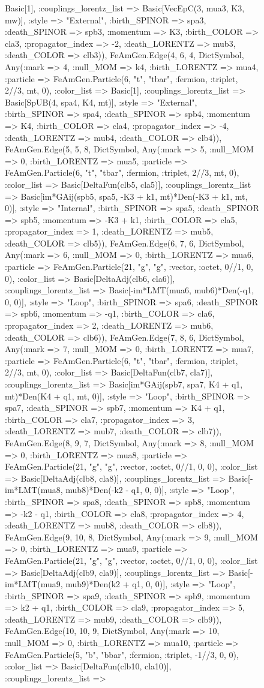 \documentclass{revtex4}
\begin{document}
\begin{figure}[!htb]
\begin{center}
{Basic[1], :couplings_lorentz_list => Basic[VecEpC(3, mua3, K3, mw)], :style => "External", :birth_SPINOR => spa3, :death_SPINOR => spb3, :momentum => K3, :birth_COLOR => cla3, :propagator_index => -2, :death_LORENTZ => mub3, :death_COLOR => clb3)), FeAmGen.Edge(4, 6, 4, Dict{Symbol, Any}(:mark => 4, :null_MOM => k4, :birth_LORENTZ => mua4, :particle => FeAmGen.Particle(6, "t", "tbar", :fermion, :triplet, 2//3, mt, 0), :color_list => Basic[1], :couplings_lorentz_list => Basic[SpUB(4, spa4, K4, mt)], :style => "External", :birth_SPINOR => spa4, :death_SPINOR => spb4, :momentum => K4, :birth_COLOR => cla4, :propagator_index => -4, :death_LORENTZ => mub4, :death_COLOR => clb4)), FeAmGen.Edge(5, 5, 8, Dict{Symbol, Any}(:mark => 5, :null_MOM => 0, :birth_LORENTZ => mua5, :particle => FeAmGen.Particle(6, "t", "tbar", :fermion, :triplet, 2//3, mt, 0), :color_list => Basic[DeltaFun(clb5, cla5)], :couplings_lorentz_list => Basic[im*GAij(spb5, spa5, -K3 + k1, mt)*Den(-K3 + k1, mt, 0)], :style => "Internal", :birth_SPINOR => spa5, :death_SPINOR => spb5, :momentum => -K3 + k1, :birth_COLOR => cla5, :propagator_index => 1, :death_LORENTZ => mub5, :death_COLOR => clb5)), FeAmGen.Edge(6, 7, 6, Dict{Symbol, Any}(:mark => 6, :null_MOM => 0, :birth_LORENTZ => mua6, :particle => FeAmGen.Particle(21, "g", "g", :vector, :octet, 0//1, 0, 0), :color_list => Basic[DeltaAdj(clb6, cla6)], :couplings_lorentz_list => Basic[-im*LMT(mua6, mub6)*Den(-q1, 0, 0)], :style => "Loop", :birth_SPINOR => spa6, :death_SPINOR => spb6, :momentum => -q1, :birth_COLOR => cla6, :propagator_index => 2, :death_LORENTZ => mub6, :death_COLOR => clb6)), FeAmGen.Edge(7, 8, 6, Dict{Symbol, Any}(:mark => 7, :null_MOM => 0, :birth_LORENTZ => mua7, :particle => FeAmGen.Particle(6, "t", "tbar", :fermion, :triplet, 2//3, mt, 0), :color_list => Basic[DeltaFun(clb7, cla7)], :couplings_lorentz_list => Basic[im*GAij(spb7, spa7, K4 + q1, mt)*Den(K4 + q1, mt, 0)], :style => "Loop", :birth_SPINOR => spa7, :death_SPINOR => spb7, :momentum => K4 + q1, :birth_COLOR => cla7, :propagator_index => 3, :death_LORENTZ => mub7, :death_COLOR => clb7)), FeAmGen.Edge(8, 9, 7, Dict{Symbol, Any}(:mark => 8, :null_MOM => 0, :birth_LORENTZ => mua8, :particle => FeAmGen.Particle(21, "g", "g", :vector, :octet, 0//1, 0, 0), :color_list => Basic[DeltaAdj(clb8, cla8)], :couplings_lorentz_list => Basic[-im*LMT(mua8, mub8)*Den(-k2 - q1, 0, 0)], :style => "Loop", :birth_SPINOR => spa8, :death_SPINOR => spb8, :momentum => -k2 - q1, :birth_COLOR => cla8, :propagator_index => 4, :death_LORENTZ => mub8, :death_COLOR => clb8)), FeAmGen.Edge(9, 10, 8, Dict{Symbol, Any}(:mark => 9, :null_MOM => 0, :birth_LORENTZ => mua9, :particle => FeAmGen.Particle(21, "g", "g", :vector, :octet, 0//1, 0, 0), :color_list => Basic[DeltaAdj(clb9, cla9)], :couplings_lorentz_list => Basic[-im*LMT(mua9, mub9)*Den(k2 + q1, 0, 0)], :style => "Loop", :birth_SPINOR => spa9, :death_SPINOR => spb9, :momentum => k2 + q1, :birth_COLOR => cla9, :propagator_index => 5, :death_LORENTZ => mub9, :death_COLOR => clb9)), FeAmGen.Edge(10, 10, 9, Dict{Symbol, Any}(:mark => 10, :null_MOM => 0, :birth_LORENTZ => mua10, :particle => FeAmGen.Particle(5, "b", "bbar", :fermion, :triplet, -1//3, 0, 0), :color_list => Basic[DeltaFun(clb10, cla10)], :couplings_lorentz_list => }
\end{center}
\end{figure}
\end{document}
